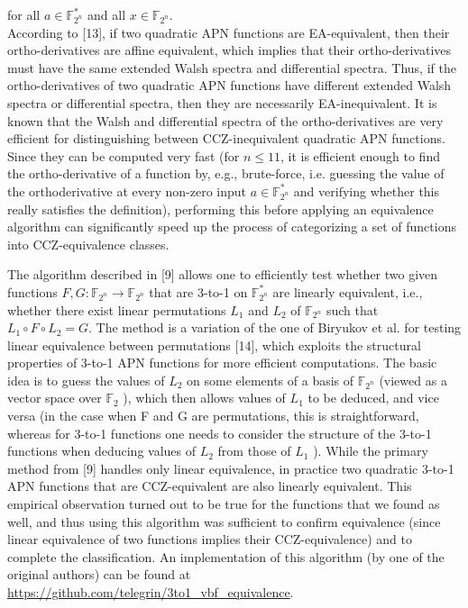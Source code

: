 \documentclass[10pt]{article}
\begin{document}
for all $a \in \mathbb{F}_{2^{n}}^{*}$ and all $x \in \mathbb{F}_{2^{n}}$.\\[0pt]
According to [13], if two quadratic APN functions are EA-equivalent, then their ortho-derivatives are affine equivalent, which implies that their ortho-derivatives must have the same extended Walsh spectra and differential spectra. Thus, if the ortho-derivatives of two quadratic APN functions have different extended Walsh spectra or differential spectra, then they are necessarily EA-inequivalent. It is known that the Walsh and differential spectra of the ortho-derivatives are very efficient for distinguishing between CCZ-inequivalent quadratic APN functions. Since they can be computed very fast (for $n \leq 11$, it is efficient enough to find the ortho-derivative of a function by, e.g., brute-force, i.e. guessing the value of the orthoderivative at every non-zero input $a \in \mathbb{F}_{2^{n}}^{*}$ and verifying whether this really satisfies the definition), performing this before applying an equivalence algorithm can significantly speed up the process of categorizing a set of functions into CCZ-equivalence classes.

The algorithm described in [9] allows one to efficiently test whether two given functions $F, G: \mathbb{F}_{2^{n}} \rightarrow \mathbb{F}_{2^{n}}$ that are 3-to-1 on $\mathbb{F}_{2^{n}}^{*}$ are linearly equivalent, i.e.,\\
whether there exist linear permutations $L_{1}$ and $L_{2}$ of $\mathbb{F}_{2^{n}}$ such that $L_{1} \circ F \circ L_{2}=G$. The method is a variation of the one of Biryukov et al. for testing linear equivalence between permutations [14], which exploits the structural properties of 3-to-1 APN functions for more efficient computations. The basic idea is to guess the values of $L_{2}$ on some elements of a basis of $\mathbb{F}_{2^{n}}$ (viewed as a vector space over $\mathbb{F}_{2}$ ), which then allows values of $L_{1}$ to be deduced, and vice versa (in the case when F and G are permutations, this is straightforward, whereas for 3-to-1 functions one needs to consider the structure of the 3-to-1 functions when deducing values of $L_{2}$ from those of $L_{1}$ ). While the primary method from [9] handles only linear equivalence, in practice two quadratic 3-to-1 APN functions that are CCZ-equivalent are also linearly equivalent. This empirical observation turned out to be true for the functions that we found as well, and thus using this algorithm was sufficient to confirm equivalence (since linear equivalence of two functions implies their CCZ-equivalence) and to complete the classification. An implementation of this algorithm (by one of the original authors) can be found at \href{https://github.com/telegrin/3to1_vbf_equivalence}{https://github.com/telegrin/3to1\_vbf\_equivalence}.
\end{document}
